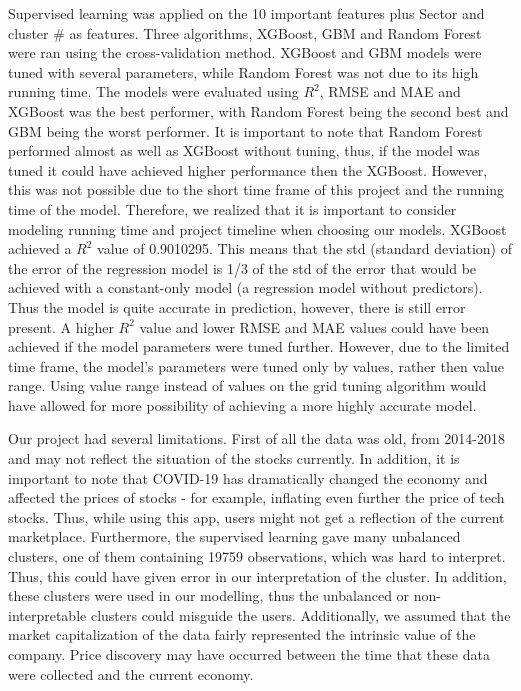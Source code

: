 \documentclass[11pt,]{article}
\begin{document}
Supervised learning was applied on the 10 important features plus Sector
and cluster \# as features. Three algorithms, XGBoost, GBM and Random
Forest were ran using the cross-validation method. XGBoost and GBM
models were tuned with several parameters, while Random Forest was not
due to its high running time. The models were evaluated using \(R^2\),
RMSE and MAE and XGBoost was the best performer, with Random Forest
being the second best and GBM being the worst performer. It is important
to note that Random Forest performed almost as well as XGBoost without
tuning, thus, if the model was tuned it could have achieved higher
performance then the XGBoost. However, this was not possible due to the
short time frame of this project and the running time of the model.
Therefore, we realized that it is important to consider modeling running
time and project timeline when choosing our models. XGBoost achieved a
\(R^2\) value of 0.9010295. This means that the std (standard deviation)
of the error of the regression model is 1/3 of the std of the error that
would be achieved with a constant-only model (a regression model without
predictors). Thus the model is quite accurate in prediction, however,
there is still error present. A higher \(R^2\) value and lower RMSE and
MAE values could have been achieved if the model parameters were tuned
further. However, due to the limited time frame, the model's parameters
were tuned only by values, rather then value range. Using value range
instead of values on the grid tuning algorithm would have allowed for
more possibility of achieving a more highly accurate model.

Our project had several limitations. First of all the data was old, from
2014-2018 and may not reflect the situation of the stocks currently. In
addition, it is important to note that COVID-19 has dramatically changed
the economy and affected the prices of stocks - for example, inflating
even further the price of tech stocks. Thus, while using this app, users
might not get a reflection of the current marketplace. Furthermore, the
supervised learning gave many unbalanced clusters, one of them
containing 19759 observations, which was hard to interpret. Thus, this
could have given error in our interpretation of the cluster. In
addition, these clusters were used in our modelling, thus the unbalanced
or non-interpretable clusters could misguide the users. Additionally, we
assumed that the market capitalization of the data fairly represented
the intrinsic value of the company. Price discovery may have occurred
between the time that these data were collected and the current economy.
\end{document}
